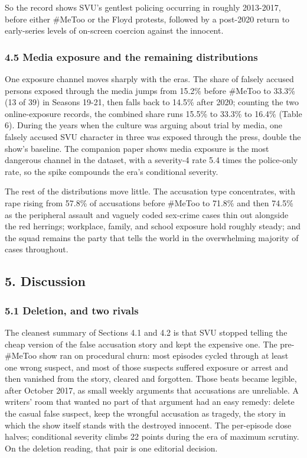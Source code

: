 \documentclass[
]{article}
\begin{document}
So the record shows SVU's gentlest policing occurring in roughly
2013-2017, before either \#MeToo or the Floyd protests, followed by a
post-2020 return to early-series levels of on-screen coercion against
the innocent.

\subsubsection{4.5 Media exposure and the remaining
distributions}\label{media-exposure-and-the-remaining-distributions}

One exposure channel moves sharply with the eras. The share of falsely
accused persons exposed through the media jumps from 15.2\% before
\#MeToo to 33.3\% (13 of 39) in Seasons 19-21, then falls back to 14.5\%
after 2020; counting the two online-exposure records, the combined share
runs 15.5\% to 33.3\% to 16.4\% (Table 6). During the years when the
culture was arguing about trial by media, one falsely accused SVU
character in three was exposed through the press, double the show's
baseline. The companion paper shows media exposure is the most dangerous
channel in the dataset, with a severity-4 rate 5.4 times the police-only
rate, so the spike compounds the era's conditional severity.

The rest of the distributions move little. The accusation type
concentrates, with rape rising from 57.8\% of accusations before \#MeToo
to 71.8\% and then 74.5\% as the peripheral assault and vaguely coded
sex-crime cases thin out alongside the red herrings; workplace, family,
and school exposure hold roughly steady; and the squad remains the party
that tells the world in the overwhelming majority of cases throughout.

\subsection{5. Discussion}\label{discussion}

\subsubsection{5.1 Deletion, and two
rivals}\label{deletion-and-two-rivals}

The cleanest summary of Sections 4.1 and 4.2 is that SVU stopped telling
the cheap version of the false accusation story and kept the expensive
one. The pre-\#MeToo show ran on procedural churn: most episodes cycled
through at least one wrong suspect, and most of those suspects suffered
exposure or arrest and then vanished from the story, cleared and
forgotten. Those beats became legible, after October 2017, as small
weekly arguments that accusations are unreliable. A writers' room that
wanted no part of that argument had an easy remedy: delete the casual
false suspect, keep the wrongful accusation as tragedy, the story in
which the show itself stands with the destroyed innocent. The
per-episode dose halves; conditional severity climbs 22 points during
the era of maximum scrutiny. On the deletion reading, that pair is one
editorial decision.
\end{document}
